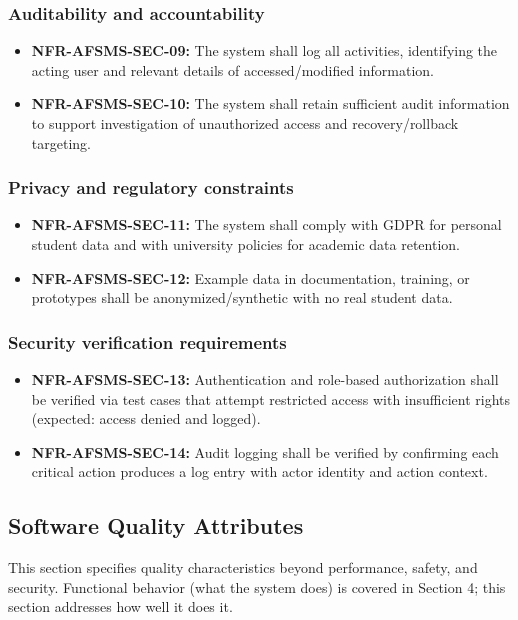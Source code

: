 \documentclass[11pt, a4paper]{article}
\begin{document}
\subsubsection{Auditability and accountability}
\begin{itemize}
    \item \textbf{NFR-AFSMS-SEC-09:} The system shall log all activities, identifying the acting user and relevant details of accessed/modified information.
    \item \textbf{NFR-AFSMS-SEC-10:} The system shall retain sufficient audit information to support investigation of unauthorized access and recovery/rollback targeting.
\end{itemize}

\subsubsection{Privacy and regulatory constraints}
\begin{itemize}
    \item \textbf{NFR-AFSMS-SEC-11:} The system shall comply with GDPR for personal student data and with university policies for academic data retention.
    \item \textbf{NFR-AFSMS-SEC-12:} Example data in documentation, training, or prototypes shall be anonymized/synthetic with no real student data.
\end{itemize}

\subsubsection{Security verification requirements}
\begin{itemize}
    \item \textbf{NFR-AFSMS-SEC-13:} Authentication and role-based authorization shall be verified via test cases that attempt restricted access with insufficient rights (expected: access denied and logged).
    \item \textbf{NFR-AFSMS-SEC-14:} Audit logging shall be verified by confirming each critical action produces a log entry with actor identity and action context.
\end{itemize}

\subsection{Software Quality Attributes}
This section specifies quality characteristics beyond performance, safety, and security. Functional behavior (what the system does) is covered in Section 4; this section addresses how well it does it.
\end{document}
